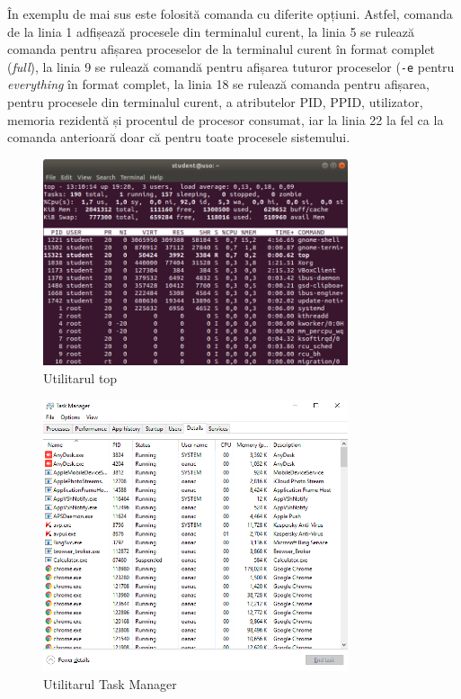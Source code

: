 În exemplu de mai sus este folosită comanda  cu diferite opțiuni. Astfel, comanda de la linia 1 adfișează procesele din terminalul curent, la linia 5 se rulează comanda pentru afișarea proceselor de la terminalul curent în format complet (\textit{full}), la linia 9 se rulează comandă pentru afișarea tuturor proceselor (\texttt{-e} pentru \textit{everything} în format complet, la linia 18 se rulează comanda pentru afișarea, pentru procesele din terminalul curent, a atributelor PID, PPID, utilizator, memoria rezidentă și procentul de procesor consumat, iar la linia 22 la fel ca la comanda anterioară doar că pentru toate procesele sistemului.

\begin{figure}[!htbp]
	\centering
        \includegraphics[width=0.8\textwidth]{chapters/04-process/img/top.png}
        \caption{Utilitarul top}
        \label{fig:process-top}
\end{figure}

\begin{figure}[!htbp]
        \centering
        \includegraphics[width=0.8\textwidth]{chapters/04-process/img/task-manager.png}
        \caption{Utilitarul Task Manager}
        \label{fig:process-task-manager}
\end{figure}

